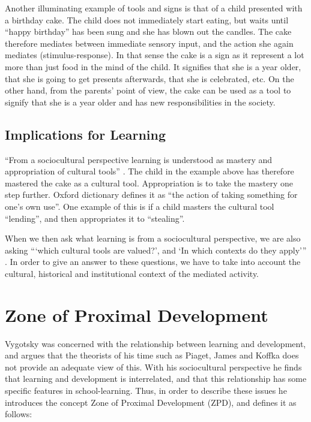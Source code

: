 Another illuminating example of tools and signs is that of a child presented with a birthday cake. The child does not immediately start eating, but waits until “happy birthday” has been sung and she has blown out the candles. The cake therefore mediates between immediate sensory input, and the action she again mediates (stimulus-response). In that sense the cake is a sign as it represent a lot more than just food in the mind of the child. It signifies that she is a year older, that she is going to get presents afterwards, that she is celebrated, etc. On the other hand, from the parents’ point of view, the cake can be used as a tool to signify that she is a year older and has new responsibilities in the society. 

\subsection{Implications for Learning}
“From a sociocultural perspective learning is understood as mastery and appropriation of cultural tools” \citetext{Wertsch, 1998, Säljö, 1999, 2001, cited in \citealp{mifsud2010reconsidering}}. The child in the example above has therefore mastered the cake as a cultural tool. Appropriation is to take the mastery one step further. Oxford dictionary defines it as “the action of taking something for one’s own use”. One example of this is if a child masters the cultural tool “lending”, and then appropriates it to “stealing”. 

When we then ask what learning is from a sociocultural perspective, we are also asking “‘which cultural tools are valued?’, and ‘In which contexts do they apply’” \citep{mifsud2010reconsidering}. In order to give an answer to these questions, we have to take into account the cultural, historical and institutional context of the mediated activity. 

\section{Zone of Proximal Development}
Vygotsky was concerned with the relationship between learning and development, and argues that the theorists of his time such as Piaget, James and Koffka does not provide an adequate view of this. With his sociocultural perspective he finds that learning and development is interrelated, and that this relationship has some specific features in school-learning. \citep[p. 84]{vygotskiui1978mind} Thus, in order to describe these issues he introduces the concept Zone of Proximal Development (ZPD), and defines it as follows:

